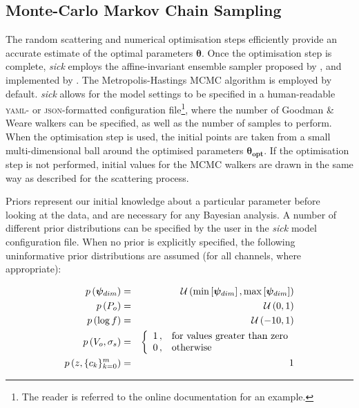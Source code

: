 \documentclass{aastex}
\newcommand{\sick}{\textit{sick}}
\begin{document}
\subsection{Monte-Carlo Markov Chain Sampling}
\label{sec:mcmc}

The random scattering and numerical optimisation steps efficiently provide an accurate estimate of the optimal parameters $\bm{\theta}$. Once the optimisation step is complete, \sick{} employs the affine-invariant ensemble sampler proposed by \citet{goodman;weare}, and implemented by \citet{emcee}. The Metropolis-Hastings MCMC algorithm is employed by default. \sick{} allows for the model settings to be specified in a human-readable \textsc{yaml}- or \textsc{json}-formatted configuration file\footnote{The reader is referred to the online documentation for an example.}, where the number of Goodman \& Weare walkers can be specified, as well as the number of samples to perform. When the optimisation step is used, the initial points are taken from a small multi-dimensional ball around the optimised parameters $\bm{\theta_{opt}}$. If the optimisation step is not performed, initial values for the MCMC walkers are drawn in the same way as described for the scattering process. 

Priors represent our initial knowledge about a particular parameter before looking at the data, and are necessary for any Bayesian analysis. A number of different prior distributions can be specified by the user in the \sick{} model configuration file. When no prior is explicitly specified, the following uninformative prior distributions are assumed (for all channels, where appropriate):

\begin{eqnarray}
p\left(\bm{\psi}_{dim}\right) &=& \mathcal{U}\left(\min\left[\bm{\psi}_{dim}\right], \max\left[\bm{\psi}_{dim}\right]\right) \\
p\left(P_o\right) &=& \mathcal{U}\left(0, 1\right) \\
p\left(\log{f}\right) &=& \mathcal{U}\left(-10, 1\right) \\
p\left(V_o,\sigma_s\right) &=& \left\{
\begin{array}{c l}      
    1\,, &\mbox{for values greater than zero}\\
    0\,, &\mbox{otherwise}
\end{array}\right. \\
p\left(z,\{c_k\}_{k=0}^{m}\right) &=& 1 \\
\label{eq:default_priors}
\end{eqnarray} 
\end{document}
